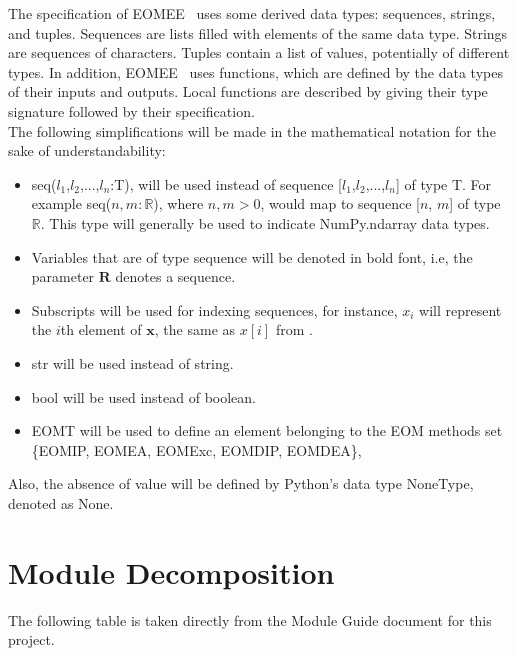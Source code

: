 \documentclass[12pt, titlepage]{article}
\begin{document}
\noindent
The specification of EOMEE \ uses some derived data types: sequences, strings, 
and tuples. Sequences are lists filled with elements of the same data type. 
Strings are sequences of characters. Tuples contain a list of values, 
potentially of different types. In addition, EOMEE \ uses functions, which
are defined by the data types of their inputs and outputs. Local functions are
described by giving their type signature followed by their specification.\\
The following simplifications will be made in the mathematical notation for the 
sake of understandability:
\begin{itemize}
	\item seq($l_1$,$l_2$,...,$l_n$:T), will be used instead of 
	sequence 
	[$l_1$,$l_2$,...,$l_n$] of type T. For example seq($n,m:\mathbb{R}$), where 
	$n,m > 0$, would map to sequence [$n$, $m$] of type $\mathbb{R}$. This 
	type will generally be used to indicate NumPy.ndarray data types.
	\item Variables that are of type sequence will be denoted in bold font, 
	i.e, the parameter $\textbf{R}$ denotes a sequence. 
	\item Subscripts will be used for indexing sequences, for instance, $x_i$ 
	will represent the $i$th element of $\textbf{x}$, the same as $x[i]$ from 
	\citet{HoffmanAndStrooper1995}.
	\item str will be used instead of string.
	\item bool will be used instead of boolean.
	\item EOMT will be used to define an element belonging to the EOM methods 
	set \{EOMIP, EOMEA, EOMExc, EOMDIP, EOMDEA\}, 
\end{itemize}
Also, the absence of value will be defined by Python's data type NoneType, 
denoted as None.


\section{Module Decomposition}

The following table is taken directly from the Module Guide document for this project.
\end{document}
